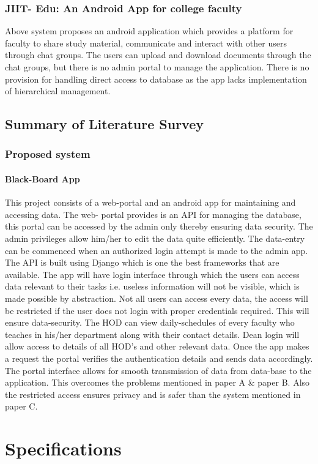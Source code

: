 \documentclass[BTech]{srmuthesis}
\begin{document}
\subsection{JIIT- Edu: An Android App for college faculty}
Above system proposes an android application which provides a platform for faculty to share
study material, communicate and interact with other users through chat groups. The users can
upload and download documents through the chat groups, but there is no admin portal to
manage the application. There is no provision for handling direct access to database as the app
lacks implementation of hierarchical management.
\section{Summary of Literature Survey}
\subsection{Proposed system}
\subsubsection{Black-Board App}
This project consists of a web-portal and an android app for maintaining and accessing data. The web-
portal provides is an \ac{API} for managing the database, this portal can be accessed by the admin only
thereby ensuring data security. The admin privileges allow him/her to edit the data quite efficiently. The
data-entry can be commenced when an authorized login attempt is made to the admin app. The \ac{API} is
built using Django which is one the best frameworks that are available. The app will have login interface
through which the users can access data relevant to their tasks i.e. useless information will not be
visible, which is made possible by abstraction. Not all users can access every data, the access will be
restricted if the user does not login with proper credentials required. This will ensure data-security. The
HOD can view daily-schedules of every faculty who teaches in his/her department along with their
contact details. Dean login will allow access to details of all HOD’s and other relevant data. Once the app
makes a request the portal verifies the authentication details and sends data accordingly. The portal
interface allows for smooth transmission of data from data-base to the application. This overcomes the
problems mentioned in paper A \& paper B. Also the restricted access ensures privacy and is safer than
the system mentioned in paper C.
\chapter{Specifications}
\end{document}
